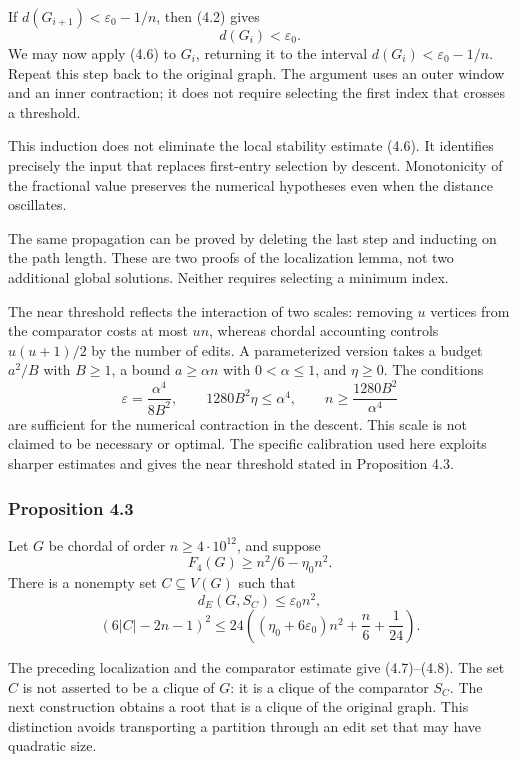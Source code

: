 \documentclass[english,11pt,a4paper]{article}
\newcounter{none}
\begin{document}
If \(d(G_{i+1})<\varepsilon_0-1/n\), then (4.2) gives \[
d(G_i)<\varepsilon_0.
\] We may now apply (4.6) to \(G_i\), returning it to the interval \(d(G_i)<\varepsilon_0-1/n\). Repeat this step back to the original graph. The argument uses an outer window and an inner contraction; it does not require selecting the first index that crosses a threshold.

This induction does not eliminate the local stability estimate (4.6). It identifies precisely the input that replaces first-entry selection by descent. Monotonicity of the fractional value preserves the numerical hypotheses even when the distance oscillates.

The same propagation can be proved by deleting the last step and inducting on the path length. These are two proofs of the localization lemma, not two additional global solutions. Neither requires selecting a minimum index.

The near threshold reflects the interaction of two scales: removing \(u\) vertices from the comparator costs at most \(un\), whereas chordal accounting controls \(u(u+1)/2\) by the number of edits. A parameterized version takes a budget \(a^2/B\) with \(B\ge1\), a bound \(a\ge\alpha n\) with \(0<\alpha\le1\), and \(\eta\ge0\). The conditions \[
\varepsilon=\frac{\alpha^4}{8B^2},\qquad
1280B^2\eta\le\alpha^4,\qquad
n\ge\frac{1280B^2}{\alpha^4}
\] are sufficient for the numerical contraction in the descent. This scale is not claimed to be necessary or optimal. The specific calibration used here exploits sharper estimates and gives the near threshold stated in Proposition 4.3.

\subsubsection{Proposition 4.3}\label{proposition-4.3}

Let \(G\) be chordal of order \(n\ge4\cdot10^{12}\), and suppose \[
F_4(G)\ge n^2/6-\eta_0n^2.
\] There is a nonempty set \(C\subseteq V(G)\) such that \[
d_E(G,S_C)\le\varepsilon_0n^2,
\tag{4.7}
\] \[
(6|C|-2n-1)^2
\le24\left((\eta_0+6\varepsilon_0)n^2+\frac n6+\frac1{24}\right).
\tag{4.8}
\]

The preceding localization and the comparator estimate give (4.7)--(4.8). The set \(C\) is not asserted to be a clique of \(G\): it is a clique of the comparator \(S_C\). The next construction obtains a root that is a clique of the original graph. This distinction avoids transporting a partition through an edit set that may have quadratic size.
\end{document}
